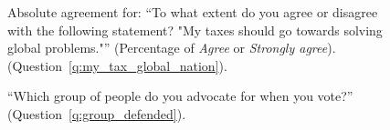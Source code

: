 \begin{figure}[h!]
    \caption[Absolute agreement: ``My taxes should go towards solving global problems'']{Absolute agreement for: ``To what extent do you agree or disagree with the following statement? "My taxes should go towards solving global problems."'' (Percentage of \textit{Agree} or \textit{Strongly agree}). (Question~\ref{q:my_tax_global_nation}).
    }\label{fig:my_tax_global_nation_positive}
\end{figure}

\begin{figure}[h!]
    \caption[Moral circle]{``Which group of people do you advocate for when you vote?'' (Question~\ref{q:group_defended}).
    }\label{fig:group_defended_all}
\end{figure}


